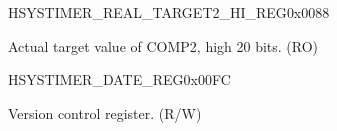 \begin{register}{H}{SYSTIMER\_REAL\_TARGET2\_HI\_REG}{0x{}0088}\label{regdesc:SYSTIMERREALTARGET2HIREG}
%
%
\regnewline%
\begin{regdesc}\begin{reglist}
\label{fielddesc:SYSTIMERTARGET2HIRO}\item [SYSTIMER\_TARGET2\_HI\_RO] Actual target value of COMP2, high 20 bits. (RO)
\end{reglist}\end{regdesc}
\end{register}


\begin{register}{H}{SYSTIMER\_DATE\_REG}{0x{}00FC}\label{regdesc:SYSTIMERDATEREG}
%
\regnewline%
\begin{regdesc}\begin{reglist}
\label{fielddesc:SYSTIMERDATE}\item [SYSTIMER\_DATE] Version control register. (R/W)
\end{reglist}\end{regdesc}
\end{register}


